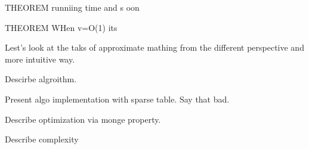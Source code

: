 THEOREM
runniing time and s oon



THEOREM
WHen v=O(1) its 

Lest's look at the taks of approximate mathing from the different perspective and more intuitive way.
  


 

Descirbe algroithm.

Present algo implementation with sparse table. Say that bad.

Describe optimization via monge property.

Describe complexity